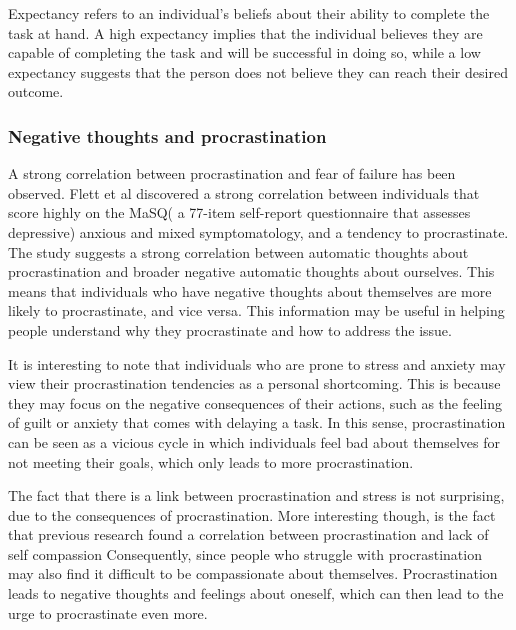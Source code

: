 
Expectancy refers to an individual's beliefs about their ability to complete the task at hand.
A high expectancy implies that the individual believes they are capable of completing the task and will be successful in doing so,
while a low expectancy suggests that the person does not believe they can reach their desired outcome. \cite{Steel2007}

\subsubsection{Negative thoughts and procrastination}

A strong correlation between procrastination and fear of failure has been observed. \cite{Flett2012Dec}
Flett et al \cite{Flett2012Dec} discovered a strong correlation between individuals that score highly on the MaSQ(
a 77-item self-report questionnaire that assesses depressive) anxious and mixed symptomatology, and a tendency to procrastinate.
The study suggests a strong correlation between automatic thoughts about procrastination and
broader negative automatic thoughts about ourselves.
This means that individuals who have negative thoughts about themselves are more likely to procrastinate, and vice versa.
This information may be useful in helping people understand why they procrastinate and how to address the issue.

It is interesting to note that individuals who are prone to stress and anxiety may view their procrastination tendencies as a
personal shortcoming. This is because they may focus on the negative consequences of their actions,
such as the feeling of guilt or anxiety that comes with delaying a task.
In this sense, procrastination can be seen as a vicious cycle in which individuals feel bad about themselves for not meeting their goals,
which only leads to more procrastination.\cite{Flett2012Dec}

The fact that there is a link between procrastination and stress \cite{Sirois2013Feb} is not surprising,
due to the consequences of procrastination. More interesting though,
is the fact that previous research found a correlation between procrastination and lack of self compassion \cite{Sirois2013Feb}
Consequently, since people who struggle with procrastination may also find
it difficult to be compassionate about themselves. Procrastination leads to negative thoughts and feelings about oneself, which can then lead to the urge to procrastinate even more.

